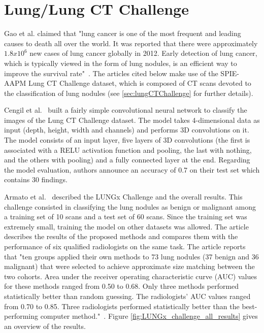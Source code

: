 \section{Lung/Lung CT Challenge}
Gao et al. claimed that "lung cancer is one of the most frequent and leading causes to death all over the world. It was reported that there were approximately $1.8x10^6$ new cases of lung cancer globally in 2012. Early detection of lung cancer, which is typically viewed in the form of lung nodules, is an efficient way to improve the survival rate"~\cite{41}. The articles cited below make use of the SPIE-AAPM Lung CT Challenge dataset, which is composed of CT scans devoted to the classification of lung nodules (see \ref{sec:lungCTChallenge} for further details).

Cengil et al.~\cite{02} built a fairly simple convolutional neural network to classify the images of the Lung CT Challenge dataset. The model takes 4-dimensional data as input (depth, height, width and channels) and performs 3D convolutions on it. The model consists of an input layer, five layers of 3D convolutions (the first is associated with a RELU activation function and pooling, the last with nothing, and the others with pooling) and a fully connected layer at the end. Regarding the model evaluation, authors announce an accuracy of 0.7 on their test set which contains 30 findings.

Armato et al.~\cite{12} described the LUNGx Challenge and the overall results. This challenge consisted in classifying the lung nodules as benign or malignant among a training set of 10 scans and a test set of 60 scans. Since the training set was extremely small, training the model on other datasets was allowed. The article describes the results of the proposed methods and compares them with the performance of six qualified radiologists on the same task. The article reports that "ten groups applied their own methods to 73 lung nodules (37 benign and 36 malignant) that were selected to achieve approximate size matching between the two cohorts. Area under the receiver operating characteristic curve (AUC) values for these methods ranged from 0.50 to 0.68. Only three methods performed statistically better than random guessing. The radiologists’ AUC values ranged from 0.70 to 0.85. Three radiologists performed statistically better than the best-performing computer method."~\cite{12}. Figure \ref{fig:LUNGx_challenge_all_results} gives an overview of the results.

